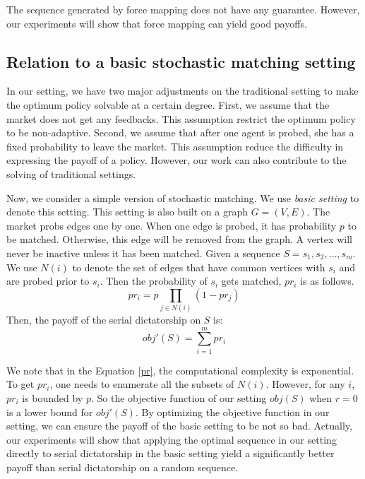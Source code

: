 \documentclass[letterpaper]{article}
\begin{document}
The sequence generated by force mapping does not have any guarantee.
However, our experiments will show that force mapping can yield good payoffs.

\subsection{Relation to a basic stochastic matching setting}

In our setting, we have two major adjustments on the traditional setting to make the optimum policy solvable at a certain degree.
First, we assume that the market does not get any feedbacks.
This assumption restrict the optimum policy to be non-adaptive.
Second, we assume that after one agent is probed, she has a fixed probability to leave the market.
This assumption reduce the difficulty in expressing the payoff of a policy.
However, our work can also contribute to the solving of traditional settings.

Now, we consider a simple version of stochastic matching.
We use \textit{basic setting} to denote this setting.
This setting is also built on a graph $G=(V,E)$.
The market probs edges one by one.
When one edge is probed, it has probability $p$ to be matched.
Otherwise, this edge will be removed from the graph.
A vertex will never be inactive unless it has been matched.
Given a sequence $S=s_1,s_2,\ldots,s_m$.
We use $N(i)$ to denote the set of edges that have common vertices with $s_i$ and are probed prior to $s_i$.
Then the probability of $s_i$ gets matched, $pr_i$ is as follows.
\begin{equation}
pr_i=p\prod_{j\in N(i)}(1-pr_j)\label{pr}
\end{equation}
Then, the payoff of the serial dictatorship on $S$ is:
\begin{equation}
obj'(S)=\sum_{i=1}^m pr_i
\end{equation}

We note that in the Equation \ref{pr}, the computational complexity is exponential.
To get $pr_i$, one needs to enumerate all the subsets of $N(i)$.
However, for any $i$, $pr_i$ is bounded by $p$.
So the objective function of our setting $obj(S)$ when $r=0$ is a lower bound for $obj'(S)$.
By optimizing the objective function in our setting, we can ensure the payoff of the basic setting to be not so bad.
Actually, our experiments will show that applying the optimal sequence in our setting directly to serial dictatorship in the basic setting yield a significantly better payoff than serial dictatorship on a random sequence. 
 
\end{document}
